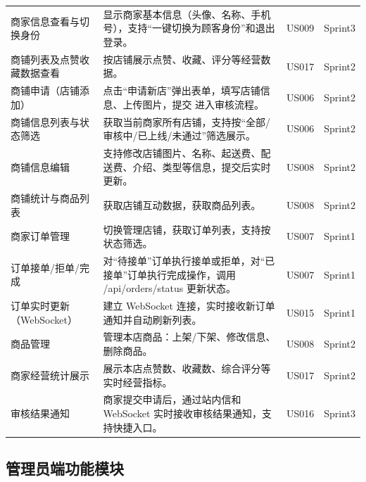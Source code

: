 \begin{longtable}{>{\centering\arraybackslash}m{3cm} >{\centering\arraybackslash}m{6.5cm} >{\centering\arraybackslash}m{2cm} >{\centering\arraybackslash}m{2cm}}
    商家信息查看与切换身份       & 显示商家基本信息（头像、名称、手机号），支持“一键切换为顾客身份”和退出登录。                    & US009              & Sprint3       \\
    商铺列表及点赞收藏数据查看     & 按店铺展示点赞、收藏、评分等经营数据。                                        & US017              & Sprint2       \\
    商铺申请（店铺添加）        & 点击“申请新店”弹出表单，填写店铺信息、上传图片，提交 进入审核流程。                        & US006              & Sprint2       \\
    商铺信息列表与状态筛选       & 获取当前商家所有店铺，支持按“全部/审核中/已上线/未通过”筛选展示。                        & US006              & Sprint2       \\
    商铺信息编辑            & 支持修改店铺图片、名称、起送费、配送费、介绍、类型等信息，提交后实时更新。                      & US008              & Sprint2       \\
    商铺统计与商品列表         & 获取店铺互动数据，获取商品列表。                                           & US008              & Sprint2       \\
    商家订单管理            & 切换管理店铺，获取订单列表，支持按状态筛选。                                     & US007              & Sprint1       \\
    订单接单/拒单/完成        & 对“待接单”订单执行接单或拒单，对“已接单”订单执行完成操作，调用 /api/orders/status 更新状态。 & US007              & Sprint1       \\
    订单实时更新（WebSocket） & 建立 WebSocket 连接，实时接收新订单通知并自动刷新列表。                          & US015              & Sprint1       \\
    商品管理              & 管理本店商品：上架/下架、修改信息、删除商品。                                    & US008              & Sprint2       \\
    商家经营统计展示          & 展示本店点赞数、收藏数、综合评分等实时经营指标。                                   & US017              & Sprint2       \\
    审核结果通知            & 商家提交申请后，通过站内信和 WebSocket 实时接收审核结果通知，支持快捷入口。                & US016              & Sprint3       \\
\end{longtable}


\subsection{管理员端功能模块}

